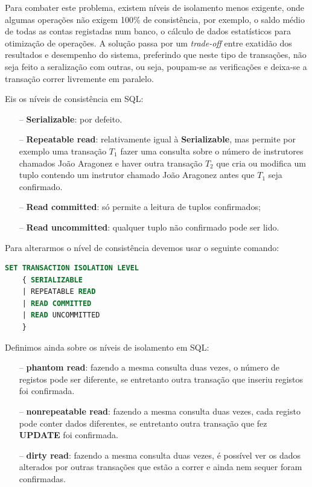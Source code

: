 \documentclass[oneside]{book}
\theoremstyle{definition}
\begin{document}
Para combater este problema, existem níveis de isolamento menos exigente, onde algumas operações não exigem 100\% de consistência, por exemplo, o saldo médio de todas as contas registadas num banco, o cálculo de dados estatísticos para otimização de operações. A solução passa por um \textit{trade-off} entre exatidão dos resultados e desempenho do sistema, preferindo que neste tipo de transações, não seja feito a seralização com outras, ou seja, poupam-se as verificações e deixa-se a transação correr livremente em paralelo.

Eis os níveis de consistência em SQL:
\begin{itemize}
    \itemsep0cm
    \item[--] \textbf{Serializable}: por defeito.
    \item[--] \textbf{Repeatable read}: relativamente igual à \textbf{Serializable}, mas permite por exemplo uma transação $T_1$ fazer uma consulta sobre o número de instrutores chamados João Aragonez e haver outra transação $T_2$ que cria ou modifica um tuplo contendo um instrutor chamado João Aragonez antes que $T_1$ seja confirmado.
    \item[--] \textbf{Read committed}: só permite a leitura de tuplos confirmados;
    \item[--] \textbf{Read uncommitted}: qualquer tuplo não confirmado pode ser lido.
\end{itemize}
Para alterarmos o nível de consistência devemos usar o seguinte comando:
\begin{lstlisting}[language=SQL, morekeywords={REFERENCES, REFRESH, MATERIALIZED, CONCURRENTLY, UNCOMMITTED, COMMITTED, REPEATABLE, SERIALIZABLE}, framesep=8pt, xleftmargin=40pt, framexleftmargin=40pt, frame=tb, framerule=0pt]
SET TRANSACTION ISOLATION LEVEL
    { SERIALIZABLE
    | REPEATABLE READ
    | READ COMMITTED
    | READ UNCOMMITTED
    }
\end{lstlisting}

Definimos ainda sobre os níveis de isolamento em SQL:
\begin{itemize}
    \itemsep0cm
    \item[--] \textbf{phantom read}: fazendo a mesma consulta duas vezes, o número de registos pode ser diferente, se entretanto outra transação que inseriu registos foi confirmada.
    \item[--] \textbf{nonrepeatable read}: fazendo a mesma consulta duas vezes, cada registo pode conter dados diferentes, se entretanto outra transação que fez \textbf{UPDATE} foi confirmada.
    \item[--] \textbf{dirty read}: fazendo a mesma consulta duas vezes, é possível ver os dados alterados por outras transações que estão a correr e ainda nem sequer foram confirmadas.
\end{itemize}
\end{document}
